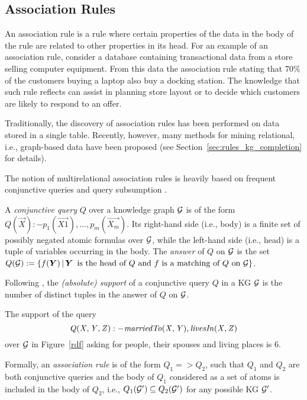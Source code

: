 \subsection{Association Rules}
An association rule is a rule where certain properties of the data in the body of
the rule are related to other properties in its head. For an example of an association rule, consider a
database containing transactional data from a store selling computer equipment.
From this data the association rule stating that 70\% of the customers
buying a laptop also buy a docking station. The knowledge that such rule reflects 
can assist in planning store layout or to decide which customers are likely to respond to an
offer.

Traditionally, the discovery of association rules  has been performed on data stored in a single table.
Recently, however, many methods for mining relational, i.e., graph-based data have been
proposed (see Section~\ref{sec:rules_kg_completion} for details). 

The notion of multirelational association rules is heavily based on frequent conjunctive queries and query subsumption \cite{warmer}. 

\begin{definition}
A \emph{conjunctive query} $Q$ over a knowledge graph $\mathcal{G}$ is of the form $Q(\vec{X}):-p_1(\vec{X1}),\dotsc,p_m(\vec{X_m})$. Its  right-hand side (i.e., body) is a finite set of possibly negated atomic formulas over $\mathcal{G}$, while the left-hand side (i.e., head) is a tuple of variables occurring in the body. The \emph{answer} of $Q$ on $\mathcal{G}$ is the set $Q(\cG):=\{f(\vec{Y})\,|\,\vec{Y}\,\text{  is the head of } Q \text{ and } f \text{ is a matching of } Q \text{ on } \cG\}$.
\end{definition}

Following \cite{DBLP:conf/ilp/DehaspeR97}, the \emph{(absolute) support} of a conjunctive query $Q$ in a KG $\mathcal{G}$ is the number of distinct tuples in the answer of $Q$ on $\mathcal{G}$. 

\begin{example}
The support of the query
\begin{equation}\mathit{Q(X,Y,Z):-marriedTo(X,Y),\, }\mathit{livesIn(X,Z)}
\end{equation}
over $\mathcal{G}$ in Figure~\ref{rdf} asking for people, their spouses and living places is $6$.
\end{example} 
Formally, an \emph{association rule} is of the form $Q_1 => Q_2$, such that $Q_1$ and $Q_2$ are both conjunctive queries and the body of $Q_1$ considered as a set of atoms is included in the body of $Q_2$,  i.e., $Q_1(\mathcal{G}')\subseteq Q_2(\mathcal{G}')$ for any possible KG $\mathcal{G}'$. 

